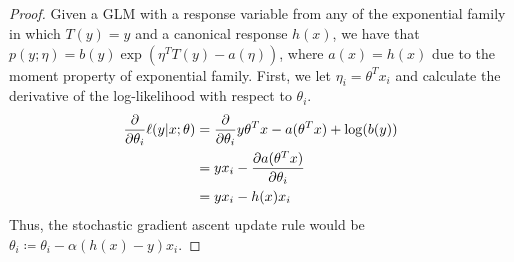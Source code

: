 \documentclass[11pt,a4paper,titlepage]{article}
\begin{document}
{\subsection{}{
\begin{proof}
\quad Given a GLM with a response variable from any of the exponential family in which $T(y) = y$ and a canonical response $h(x)$, we have that $p(y;\eta) = b(y)\exp(\eta^TT(y)-a(\eta))$, where $a(x)=h(x)$ due to the moment property of exponential family. First, we let $\eta_i=\theta^Tx_i$ and calculate the derivative of the log-likelihood with respect to $\theta_i$.
\begin{align*}
	\pdv{}{\theta_i} \ell(y|x;\theta) &= \pdv{}{\theta_i} y\theta^Tx - a(\theta^Tx) + \log(b(y))
    \\&= yx_i - \pdv{a(\theta^Tx)}{\theta_i}
    \\&= yx_i - h(x)x_i
\end{align*}
Thus, the stochastic gradient ascent update rule would be $\theta_i \coloneqq \theta_i -\alpha(h(x) - y)x_i$.
\end{proof}
}\label{prob:2d}
}\label{problem 2}
\end{document}
